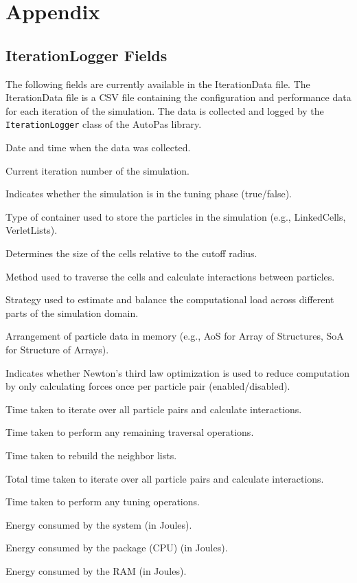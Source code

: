 \chapter{Appendix}

\section{IterationLogger Fields}
\label{des:iterationdatafields}

The following fields are currently available in the IterationData file. The IterationData file is a CSV file containing the configuration and performance data for each iteration of the simulation. The data is collected and logged by the \texttt{IterationLogger} class of the AutoPas library.

\begin{description}[style=multiline, leftmargin =40mm]
  \item[Date] Date and time when the data was collected.
  \item[Iteration] Current iteration number of the simulation.
  \item[inTuningPhase] Indicates whether the simulation is in the tuning phase (true/false).
  \item[Container] Type of container used to store the particles in the simulation (e.g., LinkedCells, VerletLists).
  \item[CellSizeFactor] Determines the size of the cells relative to the cutoff radius.
  \item[Traversal] Method used to traverse the cells and calculate interactions between particles.
  \item[Load Estimator] Strategy used to estimate and balance the computational load across different parts of the simulation domain.
  \item[Data Layout] Arrangement of particle data in memory (e.g., AoS for Array of Structures, SoA for Structure of Arrays).
  \item[Newton 3] Indicates whether Newton's third law optimization is used to reduce computation by only calculating forces once per particle pair (enabled/disabled).
  \item[iteratePairwise] Time taken to iterate over all particle pairs and calculate interactions.
  \item[remainderTraversal] Time taken to perform any remaining traversal operations.
  \item[rebuildNeighborLists] Time taken to rebuild the neighbor lists.
  \item[iteratePairwiseTotal] Total time taken to iterate over all particle pairs and calculate interactions.
  \item[tuning] Time taken to perform any tuning operations.
  \item[energyPsys] Energy consumed by the system (in Joules).
  \item[energyPkg] Energy consumed by the package (CPU) (in Joules).
  \item[energyRam] Energy consumed by the RAM (in Joules).
\end{description}


